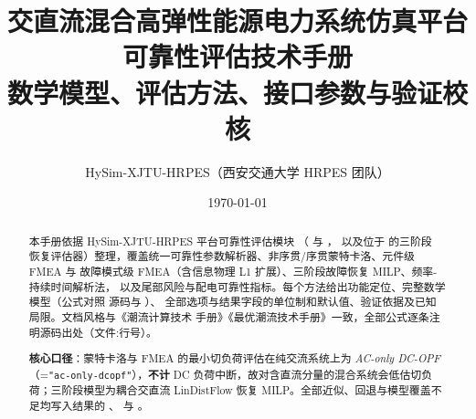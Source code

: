 \documentclass[UTF8,fontset=fandol,a4paper,11pt]{ctexart}
\title{\textbf{交直流混合高弹性能源电力系统仿真平台}\\[0.5em]
       {\Large 可靠性评估技术手册}\\[0.3em]
       {\large 数学模型、评估方法、接口参数与验证校核}}
\author{HySim-XJTU-HRPES（西安交通大学 HRPES 团队）}
\date{\today}
\begin{document}
\maketitle
\begin{abstract}
\noindent 本手册依据 HySim-XJTU-HRPES 平台可靠性评估模块
（ 与 ，
以及位于  的三阶段
恢复评估器）整理，覆盖统一可靠性参数解析器、非序贯/序贯蒙特卡洛、元件级 FMEA 与
故障模式级 FMEA（含信息物理 L1 扩展）、三阶段故障恢复 MILP、频率-持续时间解析法，
以及尾部风险与配电可靠性指标。每个方法给出功能定位、完整数学模型（公式对照
源码与
）、
全部选项与结果字段的单位制和默认值、验证依据及已知局限。文档风格与《潮流计算技术
手册》《最优潮流技术手册》一致，全部公式逐条注明源码出处（文件:行号）。

\smallskip
\noindent\textbf{核心口径}：蒙特卡洛与 FMEA 的最小切负荷评估在纯交流系统上为
\emph{AC-only DC-OPF}（=\texttt{"ac-only-dcopf"}），\textbf{不计} DC
负荷中断，故对含直流分量的混合系统会低估切负荷；三阶段模型为耦合交直流
LinDistFlow 恢复 MILP。全部近似、回退与模型覆盖不足均写入结果的 、
 与 。
\end{abstract}

\tableofcontents
\newpage












\end{document}
